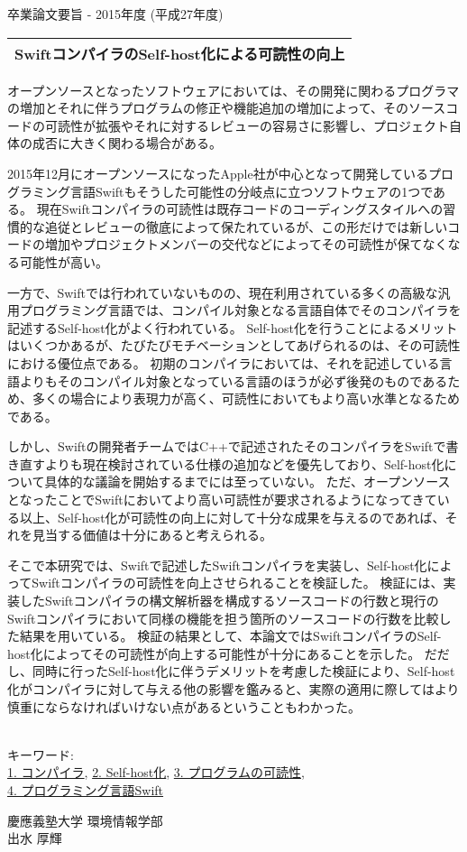 卒業論文要旨 - 2015年度 (平成27年度)
\begin{center}
\begin{Large}
\begin{tabular}{|c|} \hline
SwiftコンパイラのSelf-host化による可読性の向上
\\ \hline
\end{tabular}
\end{Large}
\end{center}

オープンソースとなったソフトウェアにおいては、その開発に関わるプログラマの増加とそれに伴うプログラムの修正や機能追加の増加によって、そのソースコードの可読性が拡張やそれに対するレビューの容易さに影響し、プロジェクト自体の成否に大きく関わる場合がある。

2015年12月にオープンソースになったApple社が中心となって開発しているプログラミング言語Swiftもそうした可能性の分岐点に立つソフトウェアの1つである。
現在Swiftコンパイラの可読性は既存コードのコーディングスタイルへの習慣的な追従とレビューの徹底によって保たれているが、この形だけでは新しいコードの増加やプロジェクトメンバーの交代などによってその可読性が保てなくなる可能性が高い。

一方で、Swiftでは行われていないものの、現在利用されている多くの高級な汎用プログラミング言語では、コンパイル対象となる言語自体でそのコンパイラを記述するSelf-host化がよく行われている。
Self-host化を行うことによるメリットはいくつかあるが、たびたびモチベーションとしてあげられるのは、その可読性における優位点である。
初期のコンパイラにおいては、それを記述している言語よりもそのコンパイル対象となっている言語のほうが必ず後発のものであるため、多くの場合により表現力が高く、可読性においてもより高い水準となるためである。

しかし、Swiftの開発者チームではC++で記述されたそのコンパイラをSwiftで書き直すよりも現在検討されている仕様の追加などを優先しており、Self-host化について具体的な議論を開始するまでには至っていない。
ただ、オープンソースとなったことでSwiftにおいてより高い可読性が要求されるようになってきている以上、Self-host化が可読性の向上に対して十分な成果を与えるのであれば、それを見当する価値は十分にあると考えられる。

そこで本研究では、Swiftで記述したSwiftコンパイラを実装し、Self-host化によってSwiftコンパイラの可読性を向上させられることを検証した。
検証には、実装したSwiftコンパイラの構文解析器を構成するソースコードの行数と現行のSwiftコンパイラにおいて同様の機能を担う箇所のソースコードの行数を比較した結果を用いている。
検証の結果として、本論文ではSwiftコンパイラのSelf-host化によってその可読性が向上する可能性が十分にあることを示した。
だだし、同時に行ったSelf-host化に伴うデメリットを考慮した検証により、Self-host化がコンパイラに対して与える他の影響を鑑みると、実際の適用に際してはより慎重にならなければいけない点があるということもわかった。

~ \\
キーワード:\\
\underline{1. コンパイラ},
\underline{2. Self-host化},
\underline{3. プログラムの可読性},\\
\underline{4. プログラミング言語Swift}
\begin{flushright}
慶應義塾大学 環境情報学部\\
出水 厚輝
\end{flushright}
